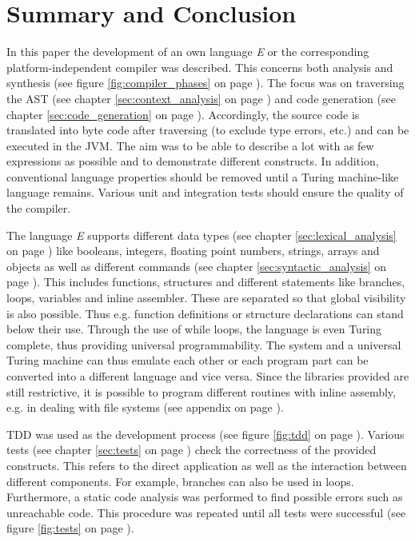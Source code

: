 \newpage
\section{Summary and Conclusion}
\label{sec:summary_conclusion}

In this paper the development of an own language \emph{E} or the corresponding platform-independent compiler was described. This concerns both analysis and synthesis (see figure \ref{fig:compiler_phases} on page \pageref{fig:compiler_phases}). The focus was on traversing the AST (see chapter \ref{sec:context_analysis} on page \pageref{sec:context_analysis}) and code generation (see chapter \ref{sec:code_generation} on page \pageref{sec:code_generation}). Accordingly, the source code is translated into byte code after traversing (to exclude type errors, etc.) and can be executed in the JVM. The aim was to be able to describe a lot with as few expressions as possible and to demonstrate different constructs. In addition, conventional language properties should be removed until a Turing machine-like language remains. Various unit and integration tests should ensure the quality of the compiler.

The language \emph{E} supports different data types (see chapter \ref{sec:lexical_analysis} on page \pageref{sec:lexical_analysis}) like booleans, integers, floating point numbers, strings, arrays and objects as well as different commands (see chapter \ref{sec:syntactic_analysis} on page \pageref{sec:syntactic_analysis}). This includes functions, structures and different statements like branches, loops, variables and inline assembler. These are separated so that global visibility is also possible. Thus e.g. function definitions or structure declarations can stand below their use. Through the use of while loops, the language is even Turing complete, thus providing universal programmability. The system and a universal Turing machine can thus emulate each other or each program part can be converted into a different language and vice versa. Since the libraries provided are still restrictive, it is possible to program different routines with inline assembly, e.g. in dealing with file systems (see appendix on page \pageref{lst:inlineAsm}).

TDD was used as the development process (see figure \ref{fig:tdd} on page \pageref{fig:tdd}). Various tests (see chapter \ref{sec:tests} on page \pageref{sec:tests}) check the correctness of the provided constructs. This refers to the direct application as well as the interaction between different components. For example, branches can also be used in loops. Furthermore, a static code analysis was performed to find possible errors such as unreachable code. This procedure was repeated until all tests were successful (see figure \ref{fig:tests} on page \pageref{fig:tests}).

